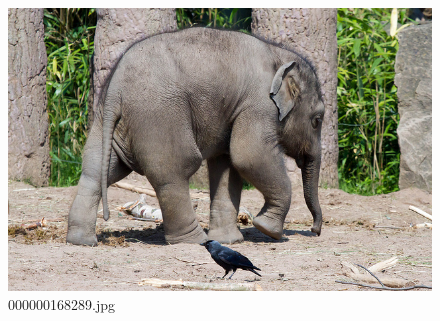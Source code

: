     \begin{figure}[h]
        \centering
        \includegraphics[width=0.8\linewidth]{../image set/easy/000000168289.jpg}
        \caption{000000168289.jpg}
    \end{figure}
